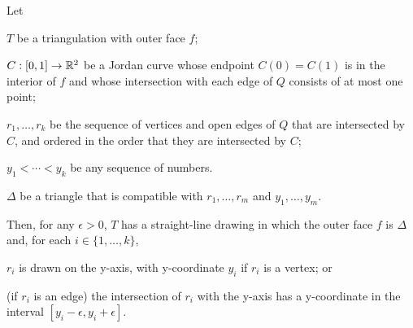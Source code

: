 \documentclass{patmorin}
\begin{document}
\begin{thm}
   Let
   \begin{compactenum}
     \item  $T$ be a triangulation with outer face $f$;
     \item  $C:[0,1]\to\mathbb{R}^2$ be a Jordan curve whose endpoint $C(0)=C(1)$
            is in the interior of $f$ and whose intersection with each
            edge of $Q$ consists of at most one point;
     \item $r_1,\ldots,r_k$ be the sequence of vertices and open edges
           of $Q$ that are intersected by $C$, and ordered in the order
           that they are intersected by $C$;
     \item $y_1<\cdots<y_k$ be any sequence of numbers.  
     \item $\Delta$ be a triangle that is compatible with 
           $r_1,\ldots,r_m$ and $y_1,\ldots,y_m$.
  \end{compactenum}
   Then, for any $\epsilon>0$, $T$ has a
   straight-line drawing in which the outer face $f$ is $\Delta$
   and, for each $i\in\{1,\ldots,k\}$, 
   \begin{compactenum}
       \item $r_i$ is drawn on the y-axis, with y-coordinate $y_i$
         if $r_i$ is a vertex; or
       \item (if $r_i$ is an edge) the intersection of $r_i$ with the
         y-axis has a y-coordinate in the interval
         $[y_i-\epsilon,y_i+\epsilon]$.
   \end{compactenum}
\end{thm}
\end{document}
